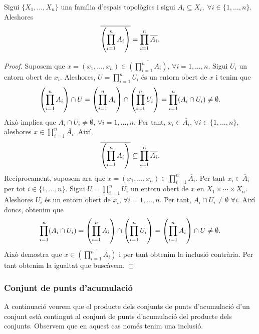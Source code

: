 \documentclass[../main.tex]{subfiles}
\begin{document}
\begin{ter}
\label{ter:clausuraespaiproducte} Sigui $\{X_1,\ldots,X_n\}$ una família d'espais topològics i sigui $A_i\subseteq X_i,\;\forall i\in\{1,\ldots,n\}$. Aleshores 
\begin{equation}
    \notag
    \overline{\left(\prod_{i=1}^n A_i\right)} = \prod_{i=1}^n \overline{A_i}.
\end{equation}
\end{ter}
\begin{proof}
Suposem que $x = (x_1,\ldots,x_n)\in\overline{\left(\prod_{i=1}^n A_i\right)}$, $\forall i=1,\ldots, n$. Sigui $U_i$ un entorn obert de $x_i$. Aleshores, $U = \prod_{i=1}^n U_i$ és un entorn obert de $x$ i tenim que
\begin{equation}
    \notag
    \left(\prod_{i=1}^n A_i\right)\cap U = \left(\prod_{i=1}^n A_i\right)\cap\left(\prod_{i=1}^n U_i\right) = \prod_{i=1}^n(A_i\cap U_i)\not=\emptyset .
\end{equation}
Això implica que $A_i\cap U_i\not=\emptyset$, $\forall i=1,\ldots,n$. Per tant, $x_i\in \overline{A_i}$, $\forall i\in\{1,\ldots,n\}$, aleshores $x\in \prod_{i=1}^n \overline{A_i}$. Així,
\begin{equation}
    \notag
    \overline{\left(\prod_{i=1}^n A_i\right)}\subseteq \prod_{i=1}^n\overline{A_i}.
\end{equation}
Recíprocament, suposem ara que $x = (x_1,\ldots,x_n)\in \prod_{i=1}^n \overline{A_i}$. Per tant $x_i\in\overline{A}_i$ per tot $i\in\{1,\ldots,n\}$. Sigui $U = \prod_{i=1}^n U_i$ un entorn obert de $x$ en $X_1\times\cdots\times X_n$. Aleshores $U_i$ és un entorn obert de $x_i$, $\forall i = 1,\ldots, n$. Per tant, $A_i\cap U_i\not=\emptyset$ $\forall i$. Així doncs, obtenim que
\begin{equation}
    \notag
    \prod_{i=1}^n(A_i\cap U_i) = \left(\prod_{i=1}^n A_i\right)\cap\left(\prod_{i=1}^n U_i\right) = \left(\prod_{i=1}^n A_i\right)\cap U\not=\emptyset.
\end{equation}
Això demostra que $x\in\overline{\left(\prod_{i=1}^n A_i\right)}$ i per tant obtenim la inclusió contrària. Per tant obtenim la igualtat que buscàvem.
\end{proof}

\subsubsection{Conjunt de punts d'acumulació}
A continuació veurem que el producte dels conjunts de punts d'acumulació d'un conjunt està contingut al conjunt de punts d'acumulació del producte dels conjunts. Observem que en aquest cas només tenim una inclusió.
\end{document}
